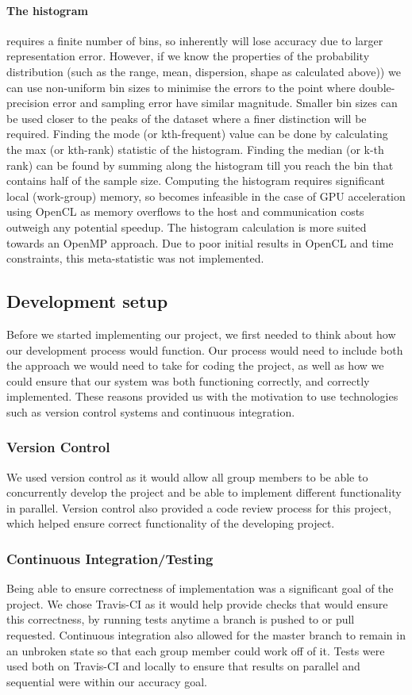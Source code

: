 \paragraph{The histogram}requires a finite number of bins, so inherently will lose accuracy due to larger representation error. However, if we know the properties of the probability distribution (such as the range, mean, dispersion, shape as calculated above)) we can use non-uniform bin sizes to minimise the errors to the point where double-precision error and sampling error have similar magnitude. Smaller bin sizes can be used closer to the peaks of the dataset where a finer distinction will be required. Finding the mode (or kth-frequent) value can be done by calculating the max (or kth-rank) statistic of the histogram. Finding the median (or k-th rank) can be found by summing along the histogram till you reach the bin that contains half of the sample size. Computing the histogram requires significant local (work-group) memory, so becomes infeasible in the case of GPU acceleration using OpenCL as memory overflows to the host and communication costs outweigh any potential speedup. The histogram calculation is more suited towards an OpenMP approach. Due to poor initial results in OpenCL and time constraints, this meta-statistic was not implemented.


\subsection{Development setup}
Before we started implementing our project, we first needed to think about how our development process would function. Our process would need to include both the approach we would need to take for coding the project, as well as how we could ensure that our system was both functioning correctly, and correctly implemented. These reasons provided us with the motivation to use technologies such as version control systems and continuous integration.

\subsubsection{Version Control}
We used version control as it would allow all group members to be able to concurrently develop the project and be able to implement different functionality in parallel. Version control also provided a code review process for this project, which helped ensure correct functionality of the developing project.


\subsubsection{Continuous Integration/Testing}
Being able to ensure correctness of implementation was a significant goal of the project. We chose Travis-CI as it would help provide checks that would ensure this correctness, by running tests anytime a branch is pushed to or pull requested. Continuous integration also allowed for the master branch to remain in an unbroken state so that each group member could work off of it.
Tests were used both on Travis-CI and locally to ensure that results on parallel and sequential were within our accuracy goal.
